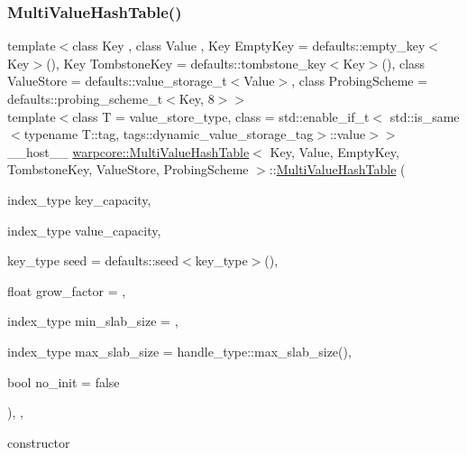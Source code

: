 \subsubsection{\texorpdfstring{Multi\+Value\+Hash\+Table()}{MultiValueHashTable()}\hspace{0.1cm}{\footnotesize\ttfamily [2/4]}}
{\footnotesize\ttfamily template$<$class Key , class Value , Key Empty\+Key = defaults\+::empty\+\_\+key$<$\+Key$>$(), Key Tombstone\+Key = defaults\+::tombstone\+\_\+key$<$\+Key$>$(), class Value\+Store  = defaults\+::value\+\_\+storage\+\_\+t$<$\+Value$>$, class Probing\+Scheme  = defaults\+::probing\+\_\+scheme\+\_\+t$<$\+Key, 8$>$$>$ \\
template$<$class T  = value\+\_\+store\+\_\+type, class  = std\+::enable\+\_\+if\+\_\+t$<$            std\+::is\+\_\+same$<$typename T\+::tag, tags\+::dynamic\+\_\+value\+\_\+storage\+\_\+tag$>$\+::value$>$$>$ \\
\+\_\+\+\_\+host\+\_\+\+\_\+ \hyperlink{classwarpcore_1_1MultiValueHashTable}{warpcore\+::\+Multi\+Value\+Hash\+Table}$<$ Key, Value, Empty\+Key, Tombstone\+Key, Value\+Store, Probing\+Scheme $>$\+::\hyperlink{classwarpcore_1_1MultiValueHashTable}{Multi\+Value\+Hash\+Table} (\begin{DoxyParamCaption}\item[{index\+\_\+type}]{key\+\_\+capacity,  }\item[{index\+\_\+type}]{value\+\_\+capacity,  }\item[{key\+\_\+type}]{seed = {\ttfamily defaults\+:\+:seed$<$key\+\_\+type$>$()},  }\item[{float}]{grow\+\_\+factor = {},  }\item[{index\+\_\+type}]{min\+\_\+slab\+\_\+size = {},  }\item[{index\+\_\+type}]{max\+\_\+slab\+\_\+size = {\ttfamily handle\+\_\+type\+:\+:max\+\_\+slab\+\_\+size()},  }\item[{bool}]{no\+\_\+init = {\ttfamily false} }\end{DoxyParamCaption})\hspace{0.3cm}{\ttfamily [inline]}, {\ttfamily [explicit]}, {\ttfamily [noexcept]}}



constructor 


